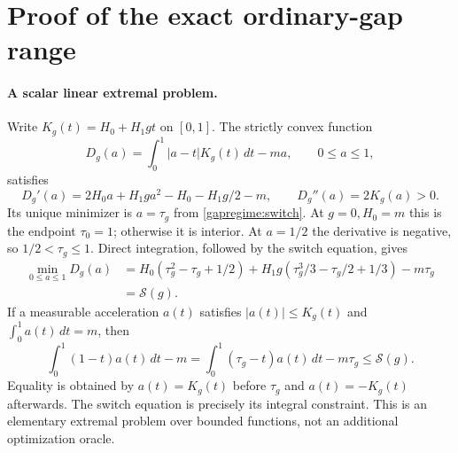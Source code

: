 \section{Proof of the exact ordinary-gap range}
\label{gapregime:proof}

\paragraph{A scalar linear extremal problem.}
Write $K_g(t)=H_0+H_1gt$ on $[0,1]$.  The strictly convex function
\[
 D_g(a)=\int_0^1|a-t|K_g(t)\,dt-ma,\qquad 0\le a\le1,
\]
satisfies
\[
 D_g'(a)=2H_0a+H_1ga^2-H_0-H_1g/2-m,
 \qquad D_g''(a)=2K_g(a)>0.
\]
Its unique minimizer is $a=\tau_g$ from
\eqref{gapregime:switch}.  At $g=0,H_0=m$ this is the endpoint
$\tau_0=1$; otherwise it is interior.  At $a=1/2$ the derivative
is negative, so $1/2<\tau_g\le1$.
Direct integration, followed by the switch equation, gives
\begin{align*}
 \min_{0\le a\le1}D_g(a)
 &=H_0(\tau_g^2-\tau_g+1/2)
   +H_1g(\tau_g^3/3-\tau_g/2+1/3)-m\tau_g\\
 &=\mathcal S(g).
\end{align*}
If a measurable acceleration $a(t)$ satisfies
$|a(t)|\le K_g(t)$ and $\int_0^1a(t)\,dt=m$, then
\begin{equation}\label{gapregime:dual-bound}
 \int_0^1(1-t)a(t)\,dt-m
 =\int_0^1(\tau_g-t)a(t)\,dt-m\tau_g
 \le\mathcal S(g).
\end{equation}
Equality is obtained by $a(t)=K_g(t)$ before $\tau_g$ and
$a(t)=-K_g(t)$ afterwards.  The switch equation is precisely its
integral constraint.  This is an elementary extremal problem over
bounded functions, not an additional optimization oracle.

